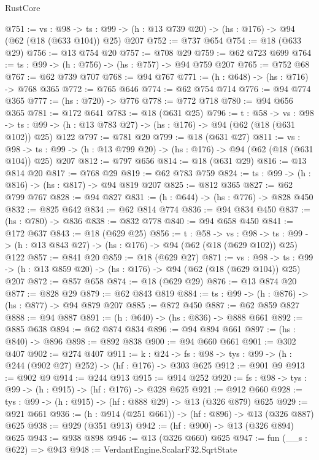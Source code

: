 \begin{lexlean}{RustCore}
\begin{coremodule}
@751 := {vs : @98} ->
  {ts : @99} -> (h : @13 @739 @20) -> (hs : @176) -> @94 (@62 (@18 (@633 @104)) @25) @207
@752 := @737 @654
@754 := @18 (@633 @29)
@756 := @13 @754 @20
@757 := @708 @29
@759 := @62 @723 @699
@764 := {ts : @99} -> (h : @756) -> (hs : @757) -> @94 @759 @207
@765 := @752 @68
@767 := @62 @739 @707
@768 := @94 @767
@771 := (h : @648) -> (hs : @716) -> @768 @365
@772 := @765 @646
@774 := @62 @754 @714
@776 := @94 @774 @365
@777 := (hs : @720) -> @776
@778 := @772 @718
@780 := @94 @656 @365
@781 := @172 @641
@783 := @18 (@631 @25)
@796 := {t : @58} ->
  {vs : @98} ->
  {ts : @99} -> (h : @13 @783 @27) -> (hs : @176) -> @94 (@62 (@18 (@631 @102)) @25) @122
@797 := @781 @20
@799 := @18 (@631 @27)
@811 := {vs : @98} ->
  {ts : @99} -> (h : @13 @799 @20) -> (hs : @176) -> @94 (@62 (@18 (@631 @104)) @25) @207
@812 := @797 @656
@814 := @18 (@631 @29)
@816 := @13 @814 @20
@817 := @768 @29
@819 := @62 @783 @759
@824 := {ts : @99} -> (h : @816) -> (hs : @817) -> @94 @819 @207
@825 := @812 @365
@827 := @62 @799 @767
@828 := @94 @827
@831 := (h : @644) -> (hs : @776) -> @828 @450
@832 := @825 @642
@834 := @62 @814 @774
@836 := @94 @834 @450
@837 := (hs : @780) -> @836
@838 := @832 @778
@840 := @94 @658 @450
@841 := @172 @637
@843 := @18 (@629 @25)
@856 := {t : @58} ->
  {vs : @98} ->
  {ts : @99} -> (h : @13 @843 @27) -> (hs : @176) -> @94 (@62 (@18 (@629 @102)) @25) @122
@857 := @841 @20
@859 := @18 (@629 @27)
@871 := {vs : @98} ->
  {ts : @99} -> (h : @13 @859 @20) -> (hs : @176) -> @94 (@62 (@18 (@629 @104)) @25) @207
@872 := @857 @658
@874 := @18 (@629 @29)
@876 := @13 @874 @20
@877 := @828 @29
@879 := @62 @843 @819
@884 := {ts : @99} -> (h : @876) -> (hs : @877) -> @94 @879 @207
@885 := @872 @450
@887 := @62 @859 @827
@888 := @94 @887
@891 := (h : @640) -> (hs : @836) -> @888 @661
@892 := @885 @638
@894 := @62 @874 @834
@896 := @94 @894 @661
@897 := (hs : @840) -> @896
@898 := @892 @838
@900 := @94 @660 @661
@901 := @302 @407
@902 := @274 @407
@911 := {k : @24} ->
  {fs : @98} -> {tys : @99} -> (h : @244 (@902 @27) @252) -> (hf : @176) -> @303 @625
@912 := @901 @9
@913 := @902 @9
@914 := @244 @913
@915 := @914 @252
@920 := {fs : @98} -> {tys : @99} -> (h : @915) -> (hf : @176) -> @328 @625
@921 := @912 @660
@928 := {tys : @99} -> (h : @915) -> (hf : @888 @29) -> @13 (@326 @879) @625
@929 := @921 @661
@936 := (h : @914 (@251 @661)) -> (hf : @896) -> @13 (@326 @887) @625
@938 := @929 (@351 @913)
@942 := (hf : @900) -> @13 (@326 @894) @625
@943 := @938 @898
@946 := @13 (@326 @660) @625
@947 := fun (__s : @622) => @943
@948 := VerdantEngine.ScalarF32.SqrtState

\end{coremodule}
\end{lexlean}
